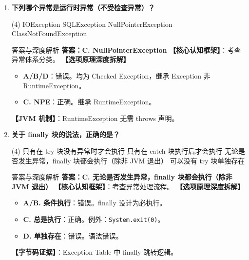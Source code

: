 ﻿\documentclass[12pt, a4paper]{ctexart}
\newcommand{\code}[1]{\texttt{#1}}
\begin{document}
\begin{enumerate}[label=\textbf{\arabic*.}, itemsep=1em]
	\item \textbf{下列哪个异常是运行时异常（不受检查异常）？}
	      \begin{tasks}(4)
		      \task IOException \task SQLException \task NullPointerException \task ClassNotFoundException
	      \end{tasks}
	      \begin{bluebox}{答案与深度解析}
		      \textbf{答案：C. NullPointerException}
		      \textbf{【核心认知框架】}：考查异常体系分类。
		      \textbf{【选项原理深度拆解】}
		      \begin{itemize}[leftmargin=*, nosep]
			      \item \textbf{A/B/D}：错误。均为 Checked Exception，继承 Exception 非 RuntimeException。
			      \item \textbf{C. NPE}：正确。继承 RuntimeException。
		      \end{itemize}
		      \textbf{【JVM 机制】}：RuntimeException 无需 throws 声明。
	      \end{bluebox}

	\item \textbf{关于 finally 块的说法，正确的是？}
	      \begin{tasks}(4)
		      \task 只有在 try 块没有异常时才会执行
		      \task 只有在 catch 块执行后才会执行
		      \task 无论是否发生异常，finally 块都会执行（除非 JVM 退出）
		      \task 可以没有 try 块单独存在
	      \end{tasks}
	      \begin{bluebox}{答案与深度解析}
		      \textbf{答案：C. 无论是否发生异常，finally 块都会执行（除非 JVM 退出）}
		      \textbf{【核心认知框架】}：考查异常处理流程。
		      \textbf{【选项原理深度拆解】}
		      \begin{itemize}[leftmargin=*, nosep]
			      \item \textbf{A/B. 条件执行}：错误。finally 设计为必执行。
			      \item \textbf{C. 总是执行}：正确。例外：\code{System.exit(0)}。
			      \item \textbf{D. 单独存在}：错误。语法错误。
		      \end{itemize}
		      \textbf{【字节码证据】}：Exception Table 中 finally 跳转逻辑。
	      \end{bluebox}


\end{enumerate}
\end{document}
